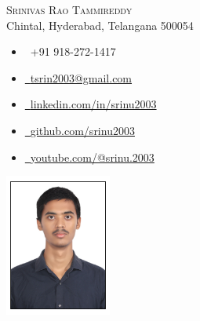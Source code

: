 \documentclass[a4paper,11pt]{article}
\begin{document}

\begin{center}

    \begin{minipage}{0.7\textwidth}
        \raggedright
        {\Huge \scshape Srinivas Rao Tammireddy} \\ \vspace{6pt}
        Chintal, Hyderabad, Telangana 500054 \\ \vspace{1pt}
        \small
        \begin{itemize}[leftmargin=0.15in, label={}]
            \item \faPhone\ +91 918-272-1417
            \item \href{mailto:tsrin2003@gmail.com}{\faEnvelope\  {tsrin2003@gmail.com}}
            \item \href{https://linkedin.com/in/srinu2003/}{\faLinkedin\ {linkedin.com/in/srinu2003}}
            \item \href{https://github.com/srinu2003}{\faGithub\ {github.com/srinu2003}}
            \item \href{https://www.youtube.com/@srinu.2003}{\faYoutube\ {youtube.com/@srinu.2003}}
        \end{itemize}
    \end{minipage}%
    \begin{minipage}{0.3\textwidth}
        \includegraphics[width=3.5cm, center]{passport-size-photo.jpg}
    \end{minipage}
\end{center}
\end{document}
